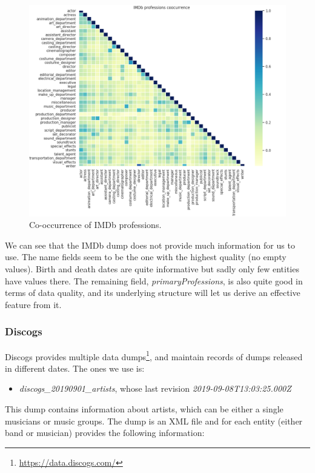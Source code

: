 \documentclass[epsfig,a4paper,11pt,titlepage,twoside,openany]{book}
\newcommand{\footurl}[1]{\footnote{\url{#1}}}
\begin{document}
\begin{figure}[]
  \centering \includegraphics[width=\textwidth]{imdb_profession_coorcurrence}
  \caption{Co-occurrence of IMDb professions.}
  \label{fig:imdb-profession-coocurrence-heatmap}
\end{figure}

We can see that the IMDb dump does not provide much information for us to use. The name fields seem to be the one with the highest quality (no empty values). Birth and death dates are quite informative but sadly only few entities have values there. The remaining field, \textit{primaryProfessions}, is also quite good in terms of data quality, and its underlying structure will let us derive an effective feature from it.



\subsubsection{Discogs}
\label{sec:shape-discogs}

Discogs provides multiple data dumps\footurl{https://data.discogs.com/}, and maintain records of dumps released in different dates. The ones we use is:

\begin{itemize}
    \item \textit{discogs\_20190901\_artists}, whose last revision \textit{2019-09-08T13:03:25.000Z}
\end{itemize}

This dump contains information about artists, which can be either a single musicians or music groups. The dump is an XML file and for each entity (either band or musician) provides the following information:
\end{document}
